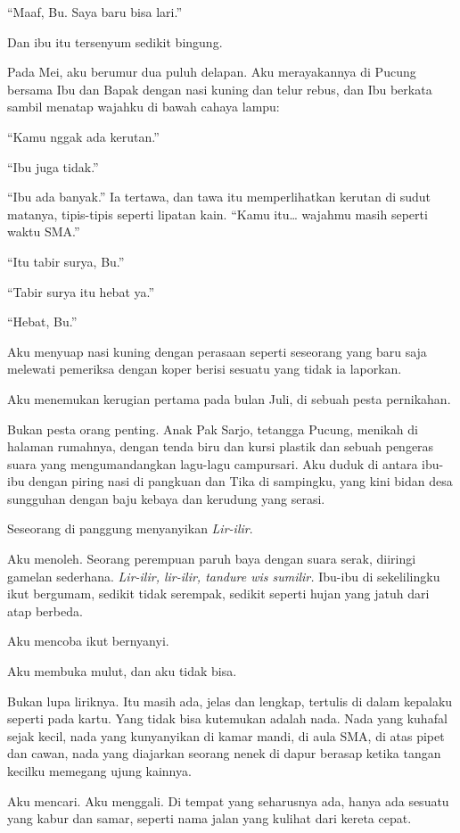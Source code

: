 \documentclass[11pt,twoside,openany]{book}
\makeatletter
\newcommand{\scenebreak}{\par\vspace{0.9em}{\centering\textsc{*\hspace{0.7em}*\hspace{0.7em}*}\par}\vspace{0.9em}\@afterindentfalse\@afterheading}
\makeatother
\begin{document}
``Maaf, Bu. Saya baru bisa lari.''

Dan ibu itu tersenyum sedikit bingung.

Pada Mei, aku berumur dua puluh delapan. Aku merayakannya di Pucung bersama Ibu dan Bapak dengan nasi kuning dan telur rebus, dan Ibu berkata sambil menatap wajahku di bawah cahaya lampu:

``Kamu nggak ada kerutan.''

``Ibu juga tidak.''

``Ibu ada banyak.'' Ia tertawa, dan tawa itu memperlihatkan kerutan di sudut matanya, tipis-tipis seperti lipatan kain. ``Kamu itu\ldots{} wajahmu masih seperti waktu SMA.''

``Itu tabir surya, Bu.''

``Tabir surya itu hebat ya.''

``Hebat, Bu.''

Aku menyuap nasi kuning dengan perasaan seperti seseorang yang baru saja melewati pemeriksa dengan koper berisi sesuatu yang tidak ia laporkan.

\scenebreak
Aku menemukan kerugian pertama pada bulan Juli, di sebuah pesta pernikahan.

Bukan pesta orang penting. Anak Pak Sarjo, tetangga Pucung, menikah di halaman rumahnya, dengan tenda biru dan kursi plastik dan sebuah pengeras suara yang mengumandangkan lagu-lagu campursari. Aku duduk di antara ibu-ibu dengan piring nasi di pangkuan dan Tika di sampingku, yang kini bidan desa sungguhan dengan baju kebaya dan kerudung yang serasi.

Seseorang di panggung menyanyikan \emph{Lir-ilir}.

Aku menoleh. Seorang perempuan paruh baya dengan suara serak, diiringi gamelan sederhana. \emph{Lir-ilir, lir-ilir, tandure wis sumilir.} Ibu-ibu di sekelilingku ikut bergumam, sedikit tidak serempak, sedikit seperti hujan yang jatuh dari atap berbeda.

Aku mencoba ikut bernyanyi.

Aku membuka mulut, dan aku tidak bisa.

Bukan lupa liriknya. Itu masih ada, jelas dan lengkap, tertulis di dalam kepalaku seperti pada kartu. Yang tidak bisa kutemukan adalah nada. Nada yang kuhafal sejak kecil, nada yang kunyanyikan di kamar mandi, di aula SMA, di atas pipet dan cawan, nada yang diajarkan seorang nenek di dapur berasap ketika tangan kecilku memegang ujung kainnya.

Aku mencari. Aku menggali. Di tempat yang seharusnya ada, hanya ada sesuatu yang kabur dan samar, seperti nama jalan yang kulihat dari kereta cepat.
\end{document}
